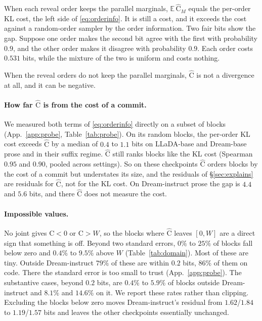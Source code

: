 \documentclass{article}
\newcommand{\C}{\mathrm{C}}
\newcommand{\Chat}{\widehat{\C}}
\begin{document}
When each reveal order keeps the parallel marginals, $\mathbb{E}\,\Chat_M$ equals the
per-order KL cost, the left side of \eqref{eq:orderinfo}. It is still a cost, and it
exceeds the cost against a random-order sampler by the order information. Two fair bits
show the gap. Suppose one order makes the second bit agree with the first with
probability $0.9$, and the other order makes it disagree with probability $0.9$. Each
order costs $0.531$ bits, while the mixture of the two is uniform and costs nothing.

When the reveal orders do not keep the parallel marginals, $\Chat$ is not a divergence
at all, and it can be negative.

\paragraph{How far $\Chat$ is from the cost of a commit.} We measured both terms of
\eqref{eq:orderinfo} directly on a subset of blocks (App.~\ref{app:probe},
Table~\ref{tab:probe}). On its random blocks, the per-order KL cost exceeds $\Chat$ by a
median of $0.4$ to $1.1$ bits on LLaDA-base and Dream-base prose and in their suffix
regime. $\Chat$ still ranks blocks like the KL cost (Spearman $0.95$ and $0.90$, pooled
across settings). So on these checkpoints $\Chat$ orders blocks by the cost of a commit
but understates its size, and the residuals of \S\ref{sec:explains} are residuals for
$\Chat$, not for the KL cost. On Dream-instruct prose the gap is $4.4$ and $5.6$ bits,
and there $\Chat$ does not measure the cost.

\paragraph{Impossible values.} No joint gives $\C<0$ or $\C>W$, so the blocks where
$\Chat$ leaves $[0,W]$ are a direct sign that something is off. Beyond two standard
errors, $0\%$ to $25\%$ of blocks fall below zero and $0.4\%$ to $9.5\%$ above $W$
(Table~\ref{tab:domain}). Most of these are tiny. Outside Dream-instruct $79\%$ of these
are within $0.2$ bits, $86\%$ of them on code. There the standard error is too small to trust (App.~\ref{app:probe}). The substantive cases, beyond $0.2$ bits, are
$0.4\%$ to $5.9\%$ of blocks outside Dream-instruct and $8.1\%$ and $14.6\%$ on it. We
report these rates rather than clipping. Excluding the blocks below zero moves
Dream-instruct's residual from $1.62$/$1.84$ to $1.19$/$1.57$ bits and leaves the other
checkpoints essentially unchanged.
\end{document}
